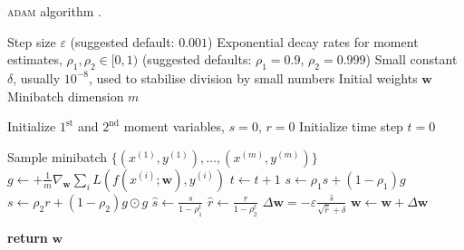 \documentclass[../main/main.tex]{subfiles}
\begin{document}
\begin{algorithm}[H]
    \caption{\textsc{adam} algorithm \cite{deeplearningbook}.}\label{alg:theory_TTN_adam}
    \begin{algorithmic}[1]
        \Require Step size \( \varepsilon \) (suggested default: \( 0.001 \))
        \Require Exponential decay rates for moment estimates, \( \rho_1, \rho_2 \in [0,1) \) (suggested defaults: \( \rho_{1}=0.9 \), \( \rho_2=0.999 \))
        \Require Small constant \( \delta \), usually \( 10^{-8} \), used to stabilise division by small numbers
        \Require Initial weights \( \boldsymbol{w} \)
        \Require Minibatch dimension \( m \)
        
                                                                 
        
        \State Initialize \( 1^\text{st} \) and \( 2^\text{nd} \) moment variables, \( s=0 \), \( r=0 \)
        \State Initialize time step \( t=0 \)
        
        \State Sample minibatch \( \{(x^{(1)},y^{(1)}), \dots, (x^{(m)},y^{(m)})\} \)%
        \State \( g \gets + \frac{1}{m} \nabla_{\boldsymbol{w}} \sum_{i} L(f(x^{(i)};\boldsymbol{w}), y^{(i)}) \) 
        \State \( t \gets t+1 \)
        \State \( s \gets \rho_1 s + (1-\rho_1) g \)                                                              
        \State \( s \gets \rho_2 r + (1-\rho_2) g \odot g \)                                                      
        \State \( \hat{s} \gets \frac{s}{1 - \rho^t_1} \)                                                         
        \State \( \hat{r} \gets \frac{r}{1 - \rho^t_2} \)                                                         
        \State \( \Delta \boldsymbol{w} = - \varepsilon \frac{\hat{s}}{\sqrt{\hat{r}} + \delta} \)                
        \State \( \boldsymbol{w} \gets \boldsymbol{w} + \Delta \boldsymbol{w} \)
        \EndWhile
        
        \State \textbf{return} \( \boldsymbol{w} \)
        \EndProcedure
    \end{algorithmic}
\end{algorithm}
\end{document}
